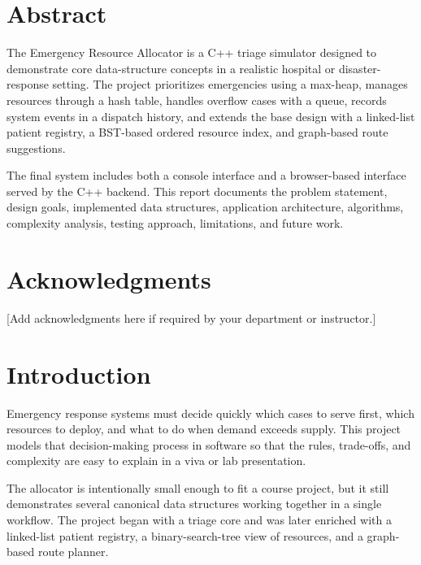 \documentclass[12pt,a4paper]{report}
\begin{document}
\chapter*{Abstract}
The Emergency Resource Allocator is a C++ triage simulator designed to demonstrate core data-structure concepts in a realistic hospital or disaster-response setting. The project prioritizes emergencies using a max-heap, manages resources through a hash table, handles overflow cases with a queue, records system events in a dispatch history, and extends the base design with a linked-list patient registry, a BST-based ordered resource index, and graph-based route suggestions.

The final system includes both a console interface and a browser-based interface served by the C++ backend. This report documents the problem statement, design goals, implemented data structures, application architecture, algorithms, complexity analysis, testing approach, limitations, and future work.

\chapter*{Acknowledgments}
[Add acknowledgments here if required by your department or instructor.]

\tableofcontents
\listoffigures
\listoftables
\clearpage
{}

\chapter{Introduction}
Emergency response systems must decide quickly which cases to serve first, which resources to deploy, and what to do when demand exceeds supply. This project models that decision-making process in software so that the rules, trade-offs, and complexity are easy to explain in a viva or lab presentation.

The allocator is intentionally small enough to fit a course project, but it still demonstrates several canonical data structures working together in a single workflow. The project began with a triage core and was later enriched with a linked-list patient registry, a binary-search-tree view of resources, and a graph-based route planner.
\end{document}
